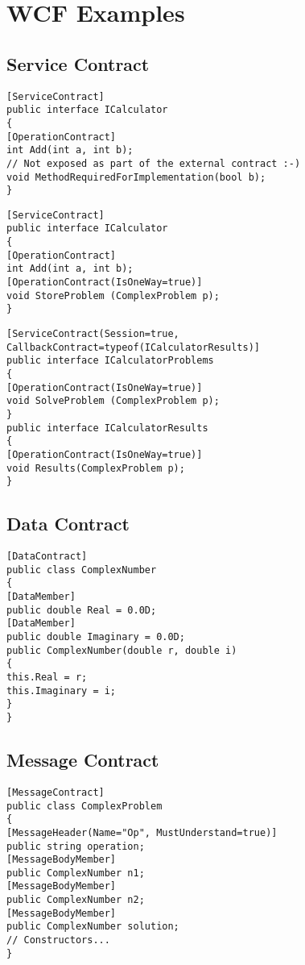 \documentclass[a4paper,10pt]{scrreprt}
\begin{document}
\section{WCF Examples}
\subsection{Service Contract}
\begin{lstlisting}[caption=Define Service Contract]
 [ServiceContract]
public interface ICalculator
{
[OperationContract]
int Add(int a, int b);
// Not exposed as part of the external contract :-)
void MethodRequiredForImplementation(bool b);
}
\end{lstlisting}
\begin{lstlisting}[caption=Service Contract: One Way]
 [ServiceContract]
public interface ICalculator
{
[OperationContract]
int Add(int a, int b);
[OperationContract(IsOneWay=true)]
void StoreProblem (ComplexProblem p);
}
\end{lstlisting}
\begin{lstlisting}[caption=Service Contract:Duplex Asymmetric]
 [ServiceContract(Session=true,
CallbackContract=typeof(ICalculatorResults)]
public interface ICalculatorProblems
{
[OperationContract(IsOneWay=true)]
void SolveProblem (ComplexProblem p);
}
public interface ICalculatorResults
{
[OperationContract(IsOneWay=true)]
void Results(ComplexProblem p);
}
\end{lstlisting}
\subsection{Data Contract}
\begin{lstlisting}[caption=Defininbg a Data Contract]
 [DataContract]
public class ComplexNumber
{
[DataMember]
public double Real = 0.0D;
[DataMember]
public double Imaginary = 0.0D;
public ComplexNumber(double r, double i)
{
this.Real = r;
this.Imaginary = i;
}
}
\end{lstlisting}
\subsection{Message Contract}
\begin{lstlisting}[caption=Define Message Contract]
 [MessageContract]
public class ComplexProblem
{
[MessageHeader(Name="Op", MustUnderstand=true)]
public string operation;
[MessageBodyMember]
public ComplexNumber n1;
[MessageBodyMember]
public ComplexNumber n2;
[MessageBodyMember]
public ComplexNumber solution;
// Constructors...
}
\end{lstlisting}
\end{document}
